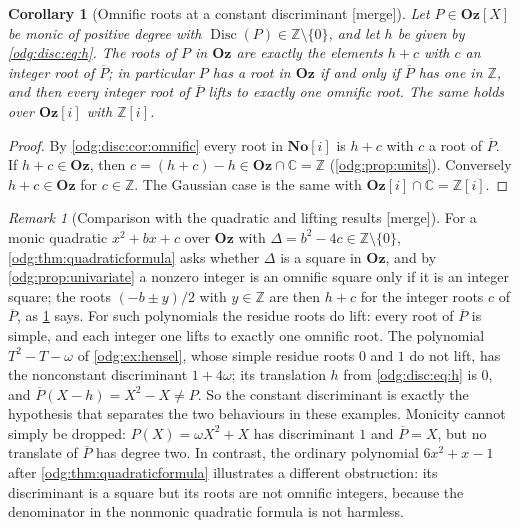\documentclass[11pt,oneside]{article}
\numberwithin{equation}{section}
\newtheorem{corollary}[corollary]{Corollary}
\theoremstyle{definition}
\theoremstyle{remark}
\newtheorem{remark}[remark]{Remark}
\newcommand{\No}{\mathbf{No}}
\newcommand{\Oz}{\mathbf{Oz}}
\newcommand{\Z}{\mathbb Z}
\newcommand{\C}{\mathbb C}
\newcommand{\mergetag}{\textup{\textsf{\small[merge]}}}
\newcommand{\Og}{\Oz[i]}
\newcommand{\Disc}{\operatorname{Disc}}
\begin{document}
\begin{corollary}[Omnific roots at a constant discriminant \mergetag]\label{odg:disc:cor:roots}
Let $P\in\Oz[X]$ be monic of positive degree with $\Disc(P)\in\Z\setminus\{0\}$, and let $h$ be given by
\eqref{odg:disc:eq:h}. The roots of $P$ in $\Oz$ are exactly the elements $h+c$ with $c$
an integer root of $\overline P$; in particular $P$ has a root in $\Oz$ if and only if
$\overline P$ has one in $\Z$, and then every integer root of $\overline P$ lifts to
exactly one omnific root. The same holds over $\Og$ with $\Z[i]$.
\end{corollary}
\begin{proof}
By \cref{odg:disc:cor:omnific} every root in $\No[i]$ is $h+c$ with $c$ a root of
$\overline P$. If $h+c\in\Oz$, then $c=(h+c)-h\in\Oz\cap\C=\Z$
(\cref{odg:prop:units}). Conversely $h+c\in\Oz$ for $c\in\Z$. The Gaussian case is the
same with $\Og\cap\C=\Z[i]$.
\end{proof}

\begin{remark}[Comparison with the quadratic and lifting results \mergetag]\label{odg:disc:rem:comparison}
For a monic quadratic $x^2+bx+c$ over $\Oz$ with $\Delta=b^2-4c\in\Z\setminus\{0\}$,
\cref{odg:thm:quadraticformula} asks whether $\Delta$ is a square in $\Oz$, and by
\cref{odg:prop:univariate} a nonzero integer is an omnific square only if it is an integer
square; the roots $(-b\pm y)/2$ with $y\in\Z$ are then $h+c$ for the integer roots $c$ of
$\overline P$, as \cref{odg:disc:cor:roots} says. For such polynomials the residue roots do
lift: every root of $\overline P$ is simple, and each integer one lifts to exactly one
omnific root. The polynomial $T^2-T-\omega$ of \cref{odg:ex:hensel}, whose simple residue
roots $0$ and $1$ do not lift, has the nonconstant discriminant $1+4\omega$; its
translation $h$ from \eqref{odg:disc:eq:h} is $0$, and $\overline P(X-h)=X^2-X\ne P$. So
the constant discriminant is exactly the hypothesis that separates the two behaviours in
these examples. Monicity cannot simply be dropped: $P(X)=\omega X^2+X$ has discriminant
$1$ and $\overline P=X$, but no translate of $\overline P$ has degree two. In contrast,
the ordinary polynomial $6x^2+x-1$ after \cref{odg:thm:quadraticformula} illustrates a
different obstruction: its discriminant is a square but its roots are not omnific
integers, because the denominator in the nonmonic quadratic formula is not harmless.
\end{remark}
\end{document}
